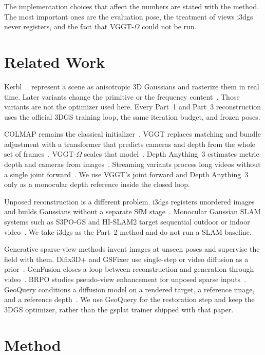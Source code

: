 \documentclass[10pt,twocolumn,letterpaper]{article}
\begin{document}
The implementation choices that affect the numbers are stated with the method.
The most important ones are the evaluation pose, the treatment of views i3dgs never registers, and the fact that VGGT-$\Omega$ could not be run.

\section{Related Work}
Kerbl~\etal~\cite{kerbl20233dgs} represent a scene as anisotropic 3D Gaussians and rasterize them in real time.
Later variants change the primitive or the frequency content~\cite{lu2024scaffold,zhao2025wavelet}.
Those variants are not the optimizer used here.
Every Part~1 and Part~3 reconstruction uses the official 3DGS training loop, the same iteration budget, and frozen poses.

COLMAP remains the classical initializer~\cite{agarwal2011rome}.
VGGT replaces matching and bundle adjustment with a transformer that predicts cameras and depth from the whole set of frames~\cite{wang2025vggt}.
VGGT-$\Omega$ scales that model~\cite{wang2026omega}.
Depth Anything~3 estimates metric depth and cameras from images~\cite{lin2025da3}.
Streaming variants process long videos without a single joint forward~\cite{chen2026lingbot,cheng2026horizon}.
We use VGGT's joint forward and Depth Anything~3 only as a monocular depth reference inside the closed loop.

Unposed reconstruction is a different problem.
i3dgs registers unordered images and builds Gaussians without a separate SfM stage~\cite{meuleman2026i3dgs}.
Monocular Gaussian SLAM systems such as S3PO-GS and HI-SLAM2 target sequential outdoor or indoor video~\cite{cheng2025s3po,zhang2025hislam}.
We take i3dgs as the Part~2 method and do not run a SLAM baseline.

Generative sparse-view methods invent images at unseen poses and supervise the field with them.
Difix3D+ and GSFixer use single-step or video diffusion as a prior~\cite{wu2025difix,yin2025gsfixer}.
GenFusion closes a loop between reconstruction and generation through video~\cite{wu2025genfusion}.
BRPO studies pseudo-view enhancement for unposed sparse inputs~\cite{zhao2026brpo}.
GeoQuery conditions a diffusion model on a rendered target, a reference image, and a reference depth~\cite{cao2026geoquery}.
We use GeoQuery for the restoration step and keep the 3DGS optimizer, rather than the gsplat trainer shipped with that paper.

\section{Method}
\end{document}
